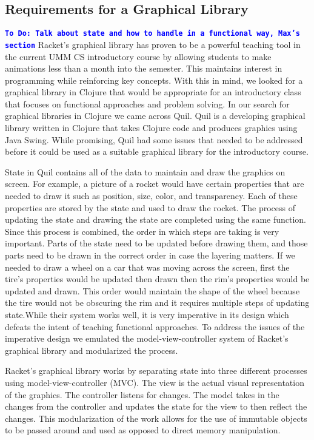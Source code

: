 \documentclass[12pt]{article}
\newcommand{\comment}[1]{{\bf \tt  {#1}}}
\newcommand{\todo}[1]{\textcolor{blue}{\comment{To Do: {#1}}}}
\begin{document}
\subsection{Requirements for a Graphical Library}\label{subsec:requirements}
\todo{Talk about state and how to handle in a functional way, Max's section}
Racket's graphical library has proven to be a powerful teaching tool in the current UMM CS introductory course by allowing students to make animations less than a month into the semester. This maintains interest in programming while reinforcing key concepts. With this in mind, we looked for a graphical library in Clojure that would be appropriate for an introductory class that focuses on functional approaches and problem solving. In our search for graphical libraries in Clojure we came across Quil. Quil is a developing graphical library written in Clojure that takes Clojure code and produces graphics using Java Swing. While promising, Quil had some issues that needed to be addressed before it could be used as a suitable graphical library for the introductory course.

State in Quil contains all of the data to maintain and draw the graphics on screen. For example, a picture of a rocket would have certain properties that are needed to draw it such as position, size, color, and transparency. Each of these properties are stored by the state and used to draw the rocket. The process of updating the state and drawing the state are completed using the same function. Since this process is combined, the order in which steps are taking is very important. Parts of the state need to be updated before drawing them, and those parts need to be drawn in the correct order in case the layering matters. If we needed to draw a wheel on a car that was moving across the screen, first the tire's properties would be updated then drawn then the rim's properties would be updated and drawn. This order would maintain the shape of the wheel because the tire would not be obscuring the rim and it requires multiple steps of updating state.While their system works well, it is very imperative in its design which defeats the intent of teaching functional approaches. To address the issues of the imperative design we emulated the model-view-controller system of Racket's graphical library and modularized the process. 

Racket's graphical library works by separating state into three different processes using model-view-controller (MVC). The view is the actual visual representation of the graphics. The controller listens for changes. The model takes in the changes from the controller and updates the state for the view to then reflect the changes. This modularization of the work allows for the use of immutable objects to be passed around and used as opposed to direct memory manipulation.
\end{document}
